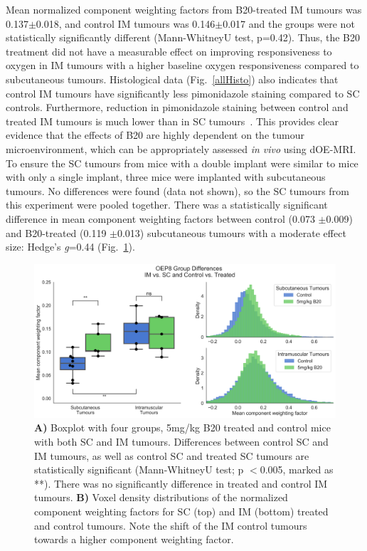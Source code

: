 Mean normalized component weighting factors from B20-treated IM tumours was 0.137$\pm$0.018, and control IM tumours was 0.146$\pm$0.017 and the groups were not statistically significantly different (Mann-WhitneyU test, p=0.42). 
Thus, the B20 treatment did not have a measurable effect on improving responsiveness to oxygen in IM tumours with a higher baseline oxygen responsiveness compared to subcutaneous tumours.
Histological data (Fig.~\ref{allHisto}) also indicates that control IM tumours have significantly less pimonidazole staining compared to SC controls.
Furthermore, reduction in pimonidazole staining between control and treated IM tumours is much lower than in SC tumours~. 
This provides clear evidence that the effects of B20 are highly dependent on the tumour microenvironment, which can be appropriately assessed \emph{in vivo} using dOE-MRI.
To ensure the SC tumours from mice with a double implant were similar to mice with only a single implant, three mice were implanted with subcutaneous tumours.
No differences were found (data not shown), so the SC tumours from this experiment were pooled together.
There was a statistically significant difference in mean component weighting factors between control (0.073 $\pm$0.009) and B20-treated (0.119 $\pm$0.013) subcutaneous tumours with a moderate effect size: Hedge's \emph{g}=0.44 (Fig.~\ref{OEP8boxplot}).

\begin{figure}[htbp]
   \centering
   \includegraphics[width=\textwidth]{oemri_thesis3/oemri_thesis3-images/4_oep8_IMSC_b20_sanitized_dOEMRI.png} %
   \caption{\textbf{A)} Boxplot with four groups, 5mg/kg B20 treated and control mice with both SC and IM tumours.
   Differences between control SC and IM tumours, as well as control SC and treated SC tumours are statistically significant (Mann-WhitneyU test; p $<$0.005, marked as **).
   There was no significantly difference in treated and control IM tumours.
   \textbf{B)} Voxel density distributions of the normalized component weighting factors for SC (top) and IM (bottom) treated and control tumours.
   Note the shift of the IM control tumours towards a higher component weighting factor.}
   \label{OEP8boxplot}
\end{figure}

